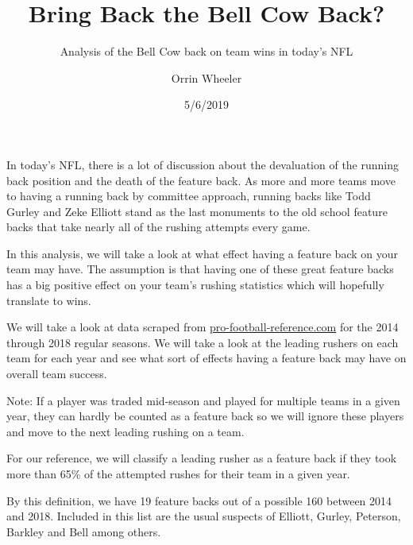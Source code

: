 \documentclass[]{article}
\title{Bring Back the Bell Cow Back?}
\subtitle{Analysis of the Bell Cow back on team wins in today's NFL}
\author{Orrin Wheeler}
\date{5/6/2019}
\begin{document}
\maketitle

In today's NFL, there is a lot of discussion about the devaluation of
the running back position and the death of the feature back. As more and
more teams move to having a running back by committee approach, running
backs like Todd Gurley and Zeke Elliott stand as the last monuments to
the old school feature backs that take nearly all of the rushing
attempts every game.

In this analysis, we will take a look at what effect having a feature
back on your team may have. The assumption is that having one of these
great feature backs has a big positive effect on your team's rushing
statistics which will hopefully translate to wins.

We will take a look at data scraped from
\href{https://www.pro-football-reference.com}{pro-football-reference.com}
for the 2014 through 2018 regular seasons. We will take a look at the
leading rushers on each team for each year and see what sort of effects
having a feature back may have on overall team success.

Note: If a player was traded mid-season and played for multiple teams in
a given year, they can hardly be counted as a feature back so we will
ignore these players and move to the next leading rushing on a team.

For our reference, we will classify a leading rusher as a feature back
if they took more than 65\% of the attempted rushes for their team in a
given year.

By this definition, we have 19 feature backs out of a possible 160
between 2014 and 2018. Included in this list are the usual suspects of
Elliott, Gurley, Peterson, Barkley and Bell among others.
\end{document}
